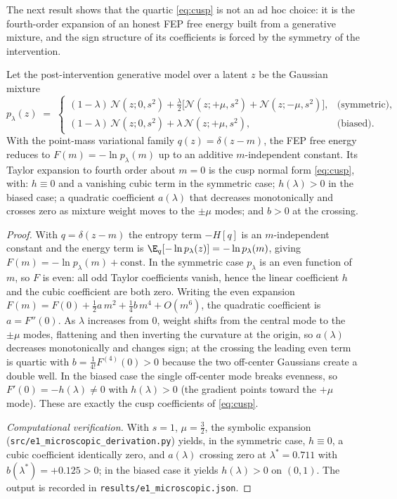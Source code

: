 The next result shows that the quartic \eqref{eq:cusp} is not an ad hoc choice: it is the
fourth-order expansion of an honest FEP free energy built from a generative mixture, and the
sign structure of its coefficients is forced by the symmetry of the intervention.

\begin{proposition}\label{prop:micro}
Let the post-intervention generative model over a latent $z$ be the Gaussian mixture
\begin{equation}\label{eq:mixture}
   p_\lambda(z)\;=\;
   \begin{cases}
     (1-\lambda)\,\mathcal N(z;0,s^2)
       +\tfrac{\lambda}{2}\bigl[\mathcal N(z;+\mu,s^2)+\mathcal N(z;-\mu,s^2)\bigr],
       & \text{(symmetric)},\\[4pt]
     (1-\lambda)\,\mathcal N(z;0,s^2)+\lambda\,\mathcal N(z;+\mu,s^2),
       & \text{(biased)}.
   \end{cases}
\end{equation}
With the point-mass variational family $q(z)=\delta(z-m)$, the FEP free energy reduces to
$F(m)=-\ln p_\lambda(m)$ up to an additive $m$-independent constant. Its Taylor expansion to
fourth order about $m=0$ is the cusp normal form \eqref{eq:cusp}, with: $h\equiv0$ and a
vanishing cubic term in the symmetric case; $h(\lambda)>0$ in the biased case; a quadratic
coefficient $a(\lambda)$ that decreases monotonically and crosses zero as mixture weight moves
to the $\pm\mu$ modes; and $b>0$ at the crossing.
\end{proposition}

\begin{proof}
With $q=\delta(z-m)$ the entropy term $-H[q]$ is an $m$-independent constant and the energy term
is $\E_q[-\ln p_\lambda(z)]=-\ln p_\lambda(m)$, giving $F(m)=-\ln p_\lambda(m)+\mathrm{const}$.
In the symmetric case $p_\lambda$ is an even function of $m$, so $F$ is even: all odd Taylor
coefficients vanish, hence the linear coefficient $h$ and the cubic coefficient are both zero.
Writing the even expansion $F(m)=F(0)+\tfrac12 a\,m^2+\tfrac14 b\,m^4+O(m^6)$, the quadratic
coefficient is $a=F''(0)$. As $\lambda$ increases from $0$, weight shifts from the central mode
to the $\pm\mu$ modes, flattening and then inverting the curvature at the origin, so $a(\lambda)$
decreases monotonically and changes sign; at the crossing the leading even term is quartic with
$b=\tfrac{1}{4!}F^{(4)}(0)>0$ because the two off-center Gaussians create a double well. In the
biased case the single off-center mode breaks evenness, so $F'(0)=-h(\lambda)\neq0$ with
$h(\lambda)>0$ (the gradient points toward the $+\mu$ mode). These are exactly the cusp
coefficients of \eqref{eq:cusp}.

\emph{Computational verification.} With $s=1$, $\mu=\tfrac32$, the symbolic expansion
(\texttt{src/e1\_microscopic\_derivation.py}) yields, in the symmetric case, $h\equiv0$, a
cubic coefficient identically zero, and $a(\lambda)$ crossing zero at $\lambda^\ast=0.711$ with
$b(\lambda^\ast)=+0.125>0$; in the biased case it yields $h(\lambda)>0$ on $(0,1)$. The output
is recorded in \texttt{results/e1\_microscopic.json}.
\end{proof}

